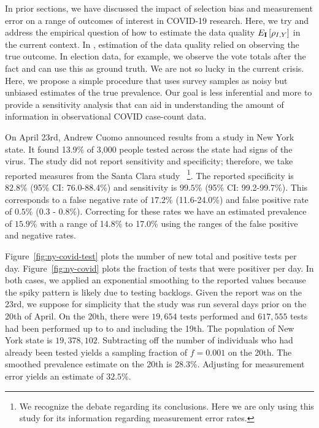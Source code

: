 \documentclass[aoas]{amsart}
\def\I{\bf I}
\begin{document}
In prior sections, we have discussed the impact of selection bias and measurement error on a range of outcomes of interest in COVID-19 research.  Here, we try and address the empirical question of how to estimate the data quality $E_{\I} \left[ \rho_{I,Y} \right]$ in the current context.
In \cite{Meng2018}, estimation of the data quality relied on observing the true outcome.  In election data, for example, we observe the vote totals after the fact and can use this as ground truth.  We are not so lucky in the current crisis.  Here, we propose a simple procedure that uses survey samples as noisy but unbiased estimates of the true prevalence. Our goal is less inferential and more to provide a sensitivity analysis that can aid in understanding the amount of information in observational COVID case-count data.

On April 23rd, Andrew Cuomo announced results from a study in New York state.  It found 13.9\% of 3,000 people tested across the state had signs of the virus.  The study did not report sensitivity and specificity; therefore, we take reported measures from the Santa Clara study~\citep{Bendavid2020} \footnote{We recognize the debate regarding its conclusions.  Here we are only using this study for its information regarding measurement error rates.}.  The reported specificity is $82.8\%$ (95\% CI: 76.0-88.4\%) and sensitivity is $99.5\%$ (95\% CI: 99.2-99.7\%).  This corresponds to a false negative rate of $17.2\%$ (11.6-24.0\%) and false positive rate of $0.5\%$ (0.3 - 0.8\%).  Correcting for these rates we have an estimated prevalence of $15.9\%$ with a range of 14.8\% to 17.0\% using the ranges of the false positive and negative rates.

Figure~\ref{fig:ny-covid-test} plots the number of new total and positive tests per day.  Figure~\ref{fig:ny-covid} plots the fraction of tests that were positiver per day.  In both cases, we applied an exponential smoothing to the reported values because the spiky pattern is likely due to testing backlogs.  Given the report was on the 23rd, we suppose for simplicity that the study was run several days prior on the 20th of April. On the 20th, there were $19,654$ tests performed and $617,555$ tests had been performed up to to and including the 19th. The population of New York state is $19,378,102$.   Subtracting off the number of individuals who had already been tested yields a sampling fraction of $f = 0.001$ on the 20th.  The smoothed prevalence estimate on the 20th is 28.3\%.  Adjusting for measurement error yields an estimate of $32.5\%$.
\end{document}
